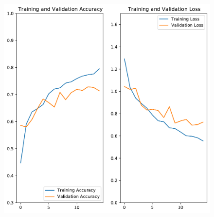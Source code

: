 \documentclass[t]{beamer}
\begin{document}
\begin{frame}
\begin{figure}
\begin{minipage}{0.5\textwidth}
            \includegraphics[width=\textwidth]{./teach-plots/post_augmentation-fixed.pdf}
        \end{minipage}
    \end{figure}
\end{frame}
\end{document}
